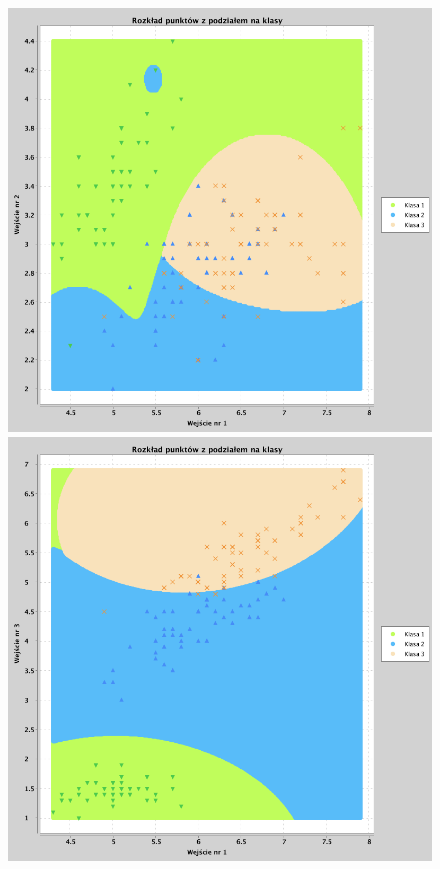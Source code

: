 \documentclass[a4paper, portrait,11pt]{article}
\begin{document}
\begin{figure}[!htb]
  \begin{minipage}{0.33\textwidth}
    \centering
    \includegraphics[width=1\linewidth]{../data/classification4/3/derivatives/2_1,2.png}
    \caption{\label{fig:43_2_1,2derivative}}
  \end{minipage}
  \begin{minipage}{0.33\textwidth}
    \centering
    \includegraphics[width=1\linewidth]{../data/classification4/3/derivatives/2_1,3.png}

\end{minipage}
\end{figure}
\end{document}
